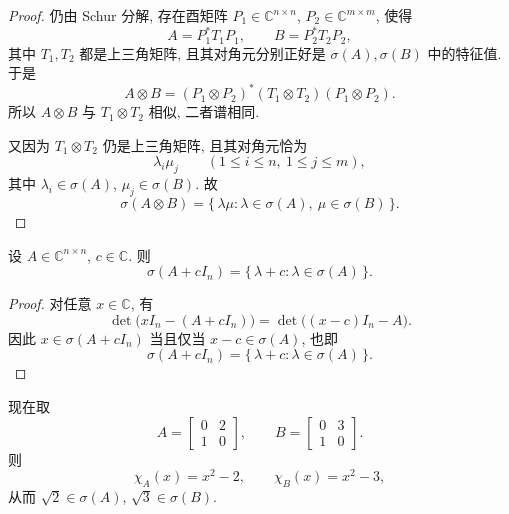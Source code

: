 \begin{problem}[选做]
\begin{solution}
    \begin{proof}[Proof]
        仍由 Schur 分解, 存在酉矩阵 $P_1\in\mathbb C^{n\times n}$, $P_2\in\mathbb C^{m\times m}$, 使得
        \[
            A=P_1^*T_1P_1,\qquad B=P_2^*T_2P_2,
        \]
        其中 $T_1,T_2$ 都是上三角矩阵, 且其对角元分别正好是 $\sigma(A),\sigma(B)$ 中的特征值. 于是
        \[
            A\otimes B
            =
            (P_1\otimes P_2)^*(T_1\otimes T_2)(P_1\otimes P_2).
        \]
        所以 $A\otimes B$ 与 $T_1\otimes T_2$ 相似, 二者谱相同.

        又因为 $T_1\otimes T_2$ 仍是上三角矩阵, 且其对角元恰为
        \[
            \lambda_i\mu_j
            \qquad
            (1\le i\le n,\ 1\le j\le m),
        \]
        其中 $\lambda_i\in\sigma(A)$, $\mu_j\in\sigma(B)$. 故
        \[
            \sigma(A \otimes B)
            =
            \{\,\lambda\mu:\lambda\in\sigma(A),\ \mu\in\sigma(B)\,\}.
        \]
    \end{proof}

    \begin{sollemma}
        设 $A\in\mathbb C^{n\times n}$, $c\in\mathbb C$. 则
        \[
            \sigma(A+cI_n)
            =
            \{\,\lambda+c:\lambda\in\sigma(A)\,\}.
        \]
    \end{sollemma}

    \begin{proof}[Proof]
        对任意 $x\in\mathbb C$, 有
        \[
            \det\bigl(xI_n-(A+cI_n)\bigr)
            =
            \det\bigl((x-c)I_n-A\bigr).
        \]
        因此 $x\in\sigma(A+cI_n)$ 当且仅当 $x-c\in\sigma(A)$, 也即
        \[
            \sigma(A+cI_n)
            =
            \{\,\lambda+c:\lambda\in\sigma(A)\,\}.
        \]
    \end{proof}

    现在取
    \[
        A=\begin{bmatrix}0&2\\1&0\end{bmatrix},
        \qquad
        B=\begin{bmatrix}0&3\\1&0\end{bmatrix}.
    \]
    则
    \[
        \chi_A(x)=x^2-2,\qquad \chi_B(x)=x^2-3,
    \]
    从而 $\sqrt2\in\sigma(A)$, $\sqrt3\in\sigma(B)$.


\end{solution}
\end{problem}
